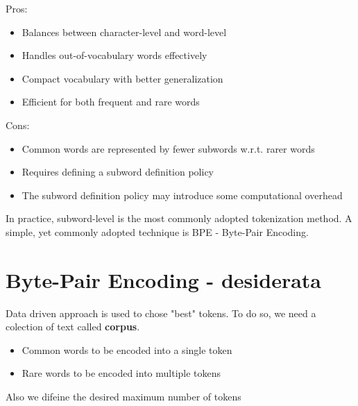 \begin{flushleft}
  \begin{minipage}[t]{0.45\linewidth}
    \raggedright
    Pros:

    \begin{itemize}
      \item Balances between character-level and word-level
      \item Handles out-of-vocabulary words effectively
      \item Compact vocabulary with better generalization
      \item Efficient for both frequent and rare words
    \end{itemize}
  \end{minipage}%
  \hfill
  \begin{minipage}[t]{0.45\linewidth}
    \raggedright

    Cons:
    \begin{itemize}
      \item Common words are represented by fewer subwords w.r.t. rarer words
      \item Requires defining a subword definition policy
      \item The subword definition policy may introduce some computational overhead
    \end{itemize}

  \end{minipage}
\end{flushleft}


In practice, subword-level is the most commonly adopted tokenization method.
A simple, yet commonly adopted technique is BPE - Byte-Pair Encoding.

\section{Byte-Pair Encoding - desiderata}

Data driven approach is used to chose "best" tokens. To do so, we need a colection of text called
\textbf{corpus}.

\begin{itemize}
  \item Common words to be encoded into a single token
  \item Rare words to be encoded into multiple tokens
\end{itemize}

Also we difeine the desired maximum number of tokens


